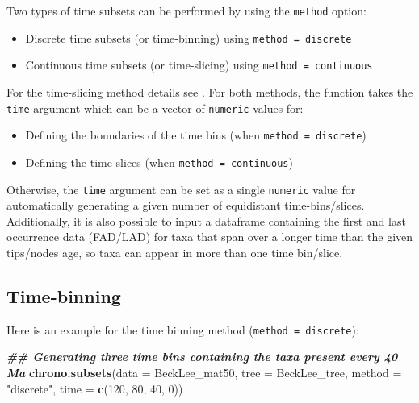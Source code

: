 \documentclass[
]{book}
\newenvironment{Shaded}{\begin{snugshade}}{\end{snugshade}}
\newcommand{\AttributeTok}[1]{\textcolor[rgb]{0.13,0.29,0.53}{#1}}
\newcommand{\DecValTok}[1]{\textcolor[rgb]{0.00,0.00,0.81}{#1}}
\newcommand{\DocumentationTok}[1]{\textcolor[rgb]{0.56,0.35,0.01}{\textbf{\textit{#1}}}}
\newcommand{\FunctionTok}[1]{\textcolor[rgb]{0.13,0.29,0.53}{\textbf{#1}}}
\newcommand{\NormalTok}[1]{#1}
\newcommand{\StringTok}[1]{\textcolor[rgb]{0.31,0.60,0.02}{#1}}
\providecommand{\tightlist}{%
  \setlength{\itemsep}{0pt}\setlength{\parskip}{0pt}}
\begin{document}
Two types of time subsets can be performed by using the \texttt{method} option:

\begin{itemize}
\tightlist
\item
  Discrete time subsets (or time-binning) using \texttt{method\ =\ discrete}
\item
  Continuous time subsets (or time-slicing) using \texttt{method\ =\ continuous}
\end{itemize}

For the time-slicing method details see \citet{time-slice}.
For both methods, the function takes the \texttt{time} argument which can be a vector of \texttt{numeric} values for:

\begin{itemize}
\tightlist
\item
  Defining the boundaries of the time bins (when \texttt{method\ =\ discrete})
\item
  Defining the time slices (when \texttt{method\ =\ continuous})
\end{itemize}

Otherwise, the \texttt{time} argument can be set as a single \texttt{numeric} value for automatically generating a given number of equidistant time-bins/slices.
Additionally, it is also possible to input a dataframe containing the first and last occurrence data (FAD/LAD) for taxa that span over a longer time than the given tips/nodes age, so taxa can appear in more than one time bin/slice.

\hypertarget{time-binning}{%
\subsection{Time-binning}\label{time-binning}}

Here is an example for the time binning method (\texttt{method\ =\ discrete}):

\begin{Shaded}
\begin{Highlighting}[]
\DocumentationTok{\#\# Generating three time bins containing the taxa present every 40 Ma}
\FunctionTok{chrono.subsets}\NormalTok{(}\AttributeTok{data =}\NormalTok{ BeckLee\_mat50, }\AttributeTok{tree =}\NormalTok{ BeckLee\_tree,}
               \AttributeTok{method =} \StringTok{"discrete"}\NormalTok{,}
               \AttributeTok{time =} \FunctionTok{c}\NormalTok{(}\DecValTok{120}\NormalTok{, }\DecValTok{80}\NormalTok{, }\DecValTok{40}\NormalTok{, }\DecValTok{0}\NormalTok{))}
\end{Highlighting}
\end{Shaded}
\end{document}
